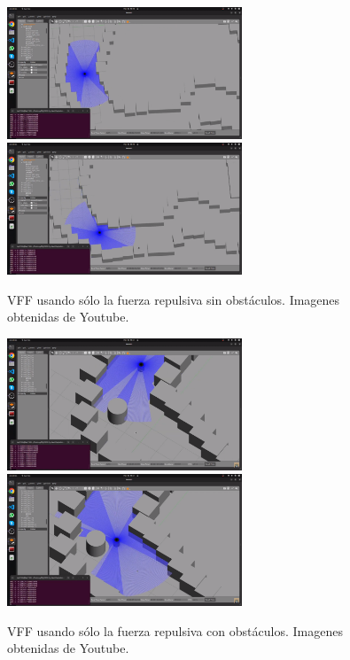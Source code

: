 \begin{figure} [H]
    \begin{center}
        \includegraphics[width=7cm]{figs/c6/VFF_rs1.png}
        \includegraphics[width=7cm]{figs/c6/VFF_rs2.png}
    \end{center}
    \caption[Secuencia VFF fuerza repulsiva sin obstáculos]{VFF usando sólo la fuerza repulsiva sin obstáculos. Imagenes obtenidas de Youtube\footnotemark.}
    \label{fig:vid_motR}
\end{figure}
\begin{figure} [H]
    \begin{center}
        \includegraphics[width=7cm]{figs/c6/VFF_rc1.png}
        \includegraphics[width=7cm]{figs/c6/VFF_rc2.png}
    \end{center}
    \caption[Secuencia bloque MotorDriverROS2 real]{VFF usando sólo la fuerza repulsiva con obstáculos. Imagenes obtenidas de Youtube\footnotemark.}
    \label{fig:vid_motR}
\end{figure}

